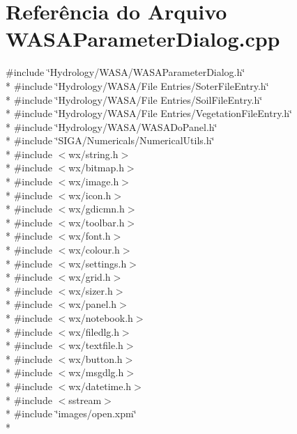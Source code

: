 \section{Referência do Arquivo W\+A\+S\+A\+Parameter\+Dialog.\+cpp}
\label{_w_a_s_a_parameter_dialog_8cpp}
{\ttfamily \#include \char`\"{}Hydrology/\+W\+A\+S\+A/\+W\+A\+S\+A\+Parameter\+Dialog.\+h\char`\"{}}\\*
{\ttfamily \#include \char`\"{}Hydrology/\+W\+A\+S\+A/\+File Entries/\+Soter\+File\+Entry.\+h\char`\"{}}\\*
{\ttfamily \#include \char`\"{}Hydrology/\+W\+A\+S\+A/\+File Entries/\+Soil\+File\+Entry.\+h\char`\"{}}\\*
{\ttfamily \#include \char`\"{}Hydrology/\+W\+A\+S\+A/\+File Entries/\+Vegetation\+File\+Entry.\+h\char`\"{}}\\*
{\ttfamily \#include \char`\"{}Hydrology/\+W\+A\+S\+A/\+W\+A\+S\+A\+Do\+Panel.\+h\char`\"{}}\\*
{\ttfamily \#include \char`\"{}S\+I\+G\+A/\+Numericals/\+Numerical\+Utils.\+h\char`\"{}}\\*
{\ttfamily \#include $<$wx/string.\+h$>$}\\*
{\ttfamily \#include $<$wx/bitmap.\+h$>$}\\*
{\ttfamily \#include $<$wx/image.\+h$>$}\\*
{\ttfamily \#include $<$wx/icon.\+h$>$}\\*
{\ttfamily \#include $<$wx/gdicmn.\+h$>$}\\*
{\ttfamily \#include $<$wx/toolbar.\+h$>$}\\*
{\ttfamily \#include $<$wx/font.\+h$>$}\\*
{\ttfamily \#include $<$wx/colour.\+h$>$}\\*
{\ttfamily \#include $<$wx/settings.\+h$>$}\\*
{\ttfamily \#include $<$wx/grid.\+h$>$}\\*
{\ttfamily \#include $<$wx/sizer.\+h$>$}\\*
{\ttfamily \#include $<$wx/panel.\+h$>$}\\*
{\ttfamily \#include $<$wx/notebook.\+h$>$}\\*
{\ttfamily \#include $<$wx/filedlg.\+h$>$}\\*
{\ttfamily \#include $<$wx/textfile.\+h$>$}\\*
{\ttfamily \#include $<$wx/button.\+h$>$}\\*
{\ttfamily \#include $<$wx/msgdlg.\+h$>$}\\*
{\ttfamily \#include $<$wx/datetime.\+h$>$}\\*
{\ttfamily \#include $<$sstream$>$}\\*
{\ttfamily \#include \char`\"{}images/open.\+xpm\char`\"{}}\\*
